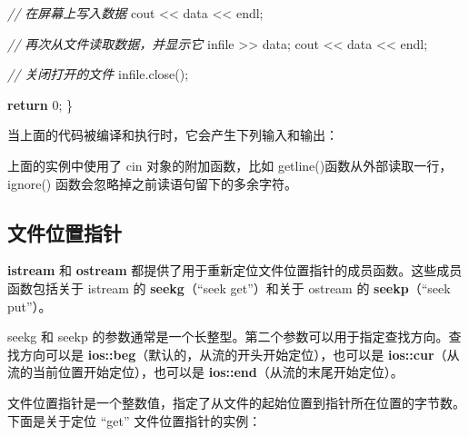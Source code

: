 \documentclass[
]{article}
\newenvironment{Shaded}{}{}
\newcommand{\CommentTok}[1]{\textcolor[rgb]{0.38,0.63,0.69}{\textit{#1}}}
\newcommand{\ControlFlowTok}[1]{\textcolor[rgb]{0.00,0.44,0.13}{\textbf{#1}}}
\newcommand{\DecValTok}[1]{\textcolor[rgb]{0.25,0.63,0.44}{#1}}
\newcommand{\ErrorTok}[1]{\textcolor[rgb]{1.00,0.00,0.00}{\textbf{#1}}}
\newcommand{\NormalTok}[1]{#1}
\newcommand{\OperatorTok}[1]{\textcolor[rgb]{0.40,0.40,0.40}{#1}}
\begin{document}
\begin{Shaded}
\begin{Highlighting}[]
   \CommentTok{// 在屏幕上写入数据}
\NormalTok{   cout }\OperatorTok{\textless{}\textless{}}\NormalTok{ data }\OperatorTok{\textless{}\textless{}}\NormalTok{ endl}\OperatorTok{;}
   
   \CommentTok{// 再次从文件读取数据，并显示它}
\NormalTok{   infile }\OperatorTok{\textgreater{}\textgreater{}}\NormalTok{ data}\OperatorTok{;} 
\NormalTok{   cout }\OperatorTok{\textless{}\textless{}}\NormalTok{ data }\OperatorTok{\textless{}\textless{}}\NormalTok{ endl}\OperatorTok{;} 

   \CommentTok{// 关闭打开的文件}
\NormalTok{   infile}\OperatorTok{.}\NormalTok{close}\OperatorTok{();}

   \ControlFlowTok{return} \DecValTok{0}\OperatorTok{;}
\OperatorTok{\}}
\end{Highlighting}
\end{Shaded}

当上面的代码被编译和执行时，它会产生下列输入和输出：

\begin{Shaded}
\end{Shaded}

上面的实例中使用了 cin 对象的附加函数，比如
getline()函数从外部读取一行，ignore()
函数会忽略掉之前读语句留下的多余字符。

\hypertarget{ux6587ux4ef6ux4f4dux7f6eux6307ux9488}{%
\subsection{文件位置指针}\label{ux6587ux4ef6ux4f4dux7f6eux6307ux9488}}

\textbf{istream} 和 \textbf{ostream}
都提供了用于重新定位文件位置指针的成员函数。这些成员函数包括关于 istream
的 \textbf{seekg}（``seek get''）和关于 ostream 的
\textbf{seekp}（``seek put''）。

seekg 和 seekp
的参数通常是一个长整型。第二个参数可以用于指定查找方向。查找方向可以是
\textbf{ios::beg}（默认的，从流的开头开始定位），也可以是
\textbf{ios::cur}（从流的当前位置开始定位），也可以是
\textbf{ios::end}（从流的末尾开始定位）。

文件位置指针是一个整数值，指定了从文件的起始位置到指针所在位置的字节数。下面是关于定位
``get'' 文件位置指针的实例：
\end{document}
